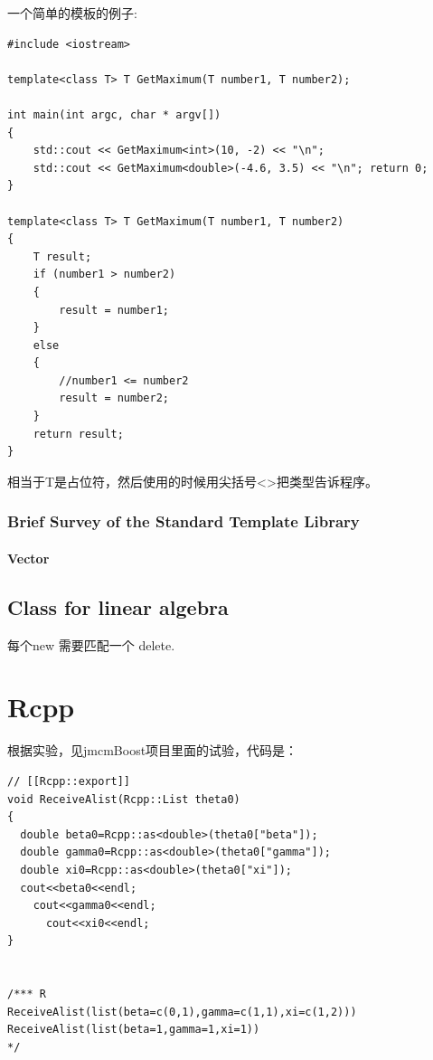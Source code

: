\documentclass[
]{book}
\theoremstyle{definition}
\theoremstyle{definition}
\theoremstyle{definition}
\theoremstyle{remark}
\begin{document}
一个简单的模板的例子:

\begin{verbatim}
#include <iostream>

template<class T> T GetMaximum(T number1, T number2); 

int main(int argc, char * argv[])
{ 
    std::cout << GetMaximum<int>(10, -2) << "\n"; 
    std::cout << GetMaximum<double>(-4.6, 3.5) << "\n"; return 0; 
}

template<class T> T GetMaximum(T number1, T number2) 
{ 
    T result; 
    if (number1 > number2) 
    { 
        result = number1; 
    } 
    else 
    { 
        //number1 <= number2 
        result = number2; 
    }
    return result;
}
\end{verbatim}

相当于T是占位符，然后使用的时候用尖括号\textless\textgreater 把类型告诉程序。

\hypertarget{brief-survey-of-the-standard-template-library}{%
\subsection{Brief Survey of the Standard Template Library}\label{brief-survey-of-the-standard-template-library}}

\hypertarget{vector}{%
\subsubsection{Vector}\label{vector}}

\hypertarget{class-for-linear-algebra}{%
\section{Class for linear algebra}\label{class-for-linear-algebra}}

每个new 需要匹配一个 delete.

\hypertarget{rcpp}{%
\chapter{Rcpp}\label{rcpp}}

根据实验，见jmcmBoost项目里面的试验，代码是：

\begin{verbatim}
// [[Rcpp::export]]
void ReceiveAlist(Rcpp::List theta0)
{
  double beta0=Rcpp::as<double>(theta0["beta"]);
  double gamma0=Rcpp::as<double>(theta0["gamma"]);
  double xi0=Rcpp::as<double>(theta0["xi"]);
  cout<<beta0<<endl;
    cout<<gamma0<<endl;
      cout<<xi0<<endl;
}


/*** R
ReceiveAlist(list(beta=c(0,1),gamma=c(1,1),xi=c(1,2)))
ReceiveAlist(list(beta=1,gamma=1,xi=1))
*/
\end{verbatim}
\end{document}
